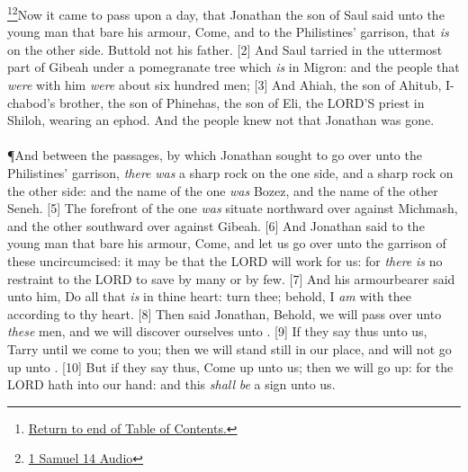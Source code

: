 \footnote{\textcolor[cmyk]{0.99998,1,0,0}{\hyperlink{TOC}{Return to end of Table of Contents.}}}\footnote{\href{https://audiobible.com/bible/1_samuel_14.html}{\textcolor[cmyk]{0.99998,1,0,0}{1 Samuel 14 Audio}}}\textcolor[cmyk]{0.99998,1,0,0}{Now it came to pass upon a day, that Jonathan the son of Saul said unto the young man that bare his armour, Come, and  to the Philistines' garrison, that \emph{is} on the other side. Buttold not his father.}
[2] \textcolor[cmyk]{0.99998,1,0,0}{And Saul tarried in the uttermost part of Gibeah under a pomegranate tree which \emph{is} in Migron: and the people that \emph{were} with him \emph{were} about six hundred men;}
[3] \textcolor[cmyk]{0.99998,1,0,0}{And Ahiah, the son of Ahitub, I-chabod's brother, the son of Phinehas, the son of Eli, the LORD'S priest in Shiloh, wearing an ephod. And the people knew not that Jonathan was gone.}\\
\\
\P \textcolor[cmyk]{0.99998,1,0,0}{And between the passages, by which Jonathan sought to go over unto the Philistines' garrison, \emph{there} \emph{was} a sharp rock on the one side, and a sharp rock on the other side: and the name of the one \emph{was} Bozez, and the name of the other Seneh.}
[5] \textcolor[cmyk]{0.99998,1,0,0}{The forefront of the one \emph{was} situate northward over against Michmash, and the other southward over against Gibeah.}
[6] \textcolor[cmyk]{0.99998,1,0,0}{And Jonathan said to the young man that bare his armour, Come, and let us go over unto the garrison of these uncircumcised: it may be that the LORD will work for us: for \emph{there} \emph{is} no restraint to the LORD to save by many or by few.}
[7] \textcolor[cmyk]{0.99998,1,0,0}{And his armourbearer said unto him, Do all that \emph{is} in thine heart: turn thee; behold, I \emph{am} with thee according to thy heart.}
[8] \textcolor[cmyk]{0.99998,1,0,0}{Then said Jonathan, Behold, we will pass over unto \emph{these} men, and we will discover ourselves unto .}
[9] \textcolor[cmyk]{0.99998,1,0,0}{If they say thus unto us, Tarry until we come to you; then we will stand still in our place, and will not go up unto .}
[10] \textcolor[cmyk]{0.99998,1,0,0}{But if they say thus, Come up unto us; then we will go up: for the LORD hath   into our hand: and this \emph{shall} \emph{be} a sign unto us.}
